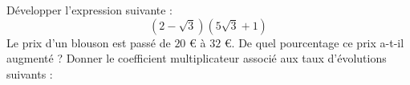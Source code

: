 \documentclass{exam}
\begin{document}
\begin{questions}
\question Développer l'expression suivante :
\begin{equation*}
(2 - \sqrt{3})(5\sqrt{3} + 1)
\end{equation*}
\vspace*{0.5cm}
\question Le prix d'un blouson est passé de $20$ \euro{} à $32$ \euro. De quel pourcentage ce prix a-t-il augmenté ?
\vspace*{0.5cm}
\question Donner le coefficient multiplicateur associé aux taux d'évolutions suivants :
\vspace*{1cm}
\end{questions}
\end{document}
